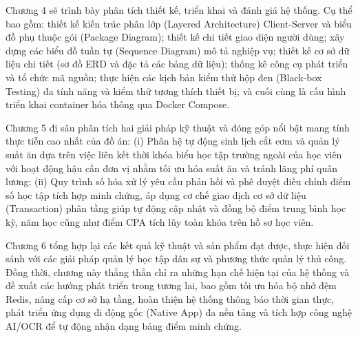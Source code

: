 \documentclass[../DoAn.tex]{subfiles}
\begin{document}
Chương 4 sẽ  trình bày phân tích thiết kế, triển khai và đánh giá hệ thống. Cụ thể bao gồm: thiết kế kiến trúc phân lớp (Layered Architecture) Client-Server và biểu đồ phụ thuộc gói (Package Diagram); thiết kế chi tiết giao diện người dùng; xây dựng các biểu đồ tuần tự (Sequence Diagram) mô tả nghiệp vụ; thiết kế cơ sở dữ liệu chi tiết (sơ đồ ERD và đặc tả các bảng dữ liệu); thống kê công cụ phát triển và tổ chức mã nguồn; thực hiện các kịch bản kiểm thử hộp đen (Black-box Testing) đa tính năng và kiểm thử tương thích thiết bị; và cuối cùng là cấu hình triển khai container hóa thông qua Docker Compose.

Chương 5 đi sâu phân tích hai giải pháp kỹ thuật và đóng góp nổi bật mang tính thực tiễn cao nhất của đồ án: (i) Phân hệ tự động sinh lịch cắt cơm và quản lý suất ăn dựa trên việc liên kết thời khóa biểu học tập trường ngoài của học viên với hoạt động hậu cần đơn vị nhằm tối ưu hóa suất ăn và tránh lãng phí quân lương; (ii) Quy trình số hóa xử lý yêu cầu phản hồi và phê duyệt điều chỉnh điểm số học tập tích hợp minh chứng, áp dụng cơ chế giao dịch cơ sở dữ liệu (Transaction) phân tầng giúp tự động cập nhật và đồng bộ điểm trung bình học kỳ, năm học cũng như điểm CPA tích lũy toàn khóa trên hồ sơ học viên.

Chương 6 tổng hợp lại các kết quả kỹ thuật và sản phẩm đạt được, thực hiện đối sánh với các giải pháp quản lý học tập dân sự và phương thức quản lý thủ công. Đồng thời, chương này thẳng thắn chỉ ra những hạn chế hiện tại của hệ thống và đề xuất các hướng phát triển trong tương lai, bao gồm tối ưu hóa bộ nhớ đệm Redis, nâng cấp cơ sở hạ tầng, hoàn thiện hệ thống thông báo thời gian thực, phát triển ứng dụng di động gốc (Native App) đa nền tảng và tích hợp công nghệ AI/OCR để tự động nhận dạng bảng điểm minh chứng.
\end{document}
